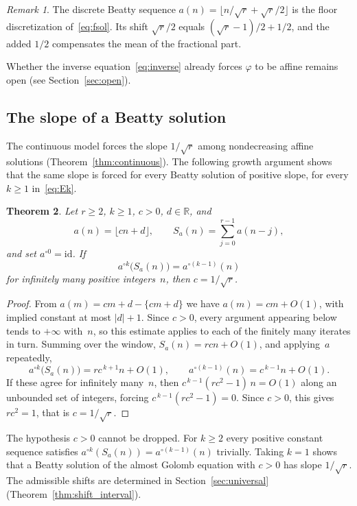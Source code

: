 \documentclass{birkjour}
\newtheorem{theorem}{Theorem}
\theoremstyle{definition}
\theoremstyle{remark}
\newtheorem{remark}[theorem]{Remark}
\newcommand{\fl}[1]{\lfloor #1 \rfloor}
\newcommand{\frc}[1]{\{ #1 \}}
\begin{document}
\begin{remark}
The discrete Beatty sequence
$a(n)=\fl{n/\!\sqrt{r}+\sqrt{r}/2}$ is the floor
discretization of~\eqref{eq:fsol}. Its shift $\sqrt{r}/2$
equals $(\sqrt{r}-1)/2+1/2$, and the added $1/2$ compensates
the mean of the fractional part.
\end{remark}

Whether the inverse equation~\eqref{eq:inverse}
already forces $\varphi$ to be affine remains open
(see Section~\ref{sec:open}).

\subsection{The slope of a Beatty solution}

The continuous model forces the slope $1/\!\sqrt{r}$ among
nondecreasing affine solutions (Theorem~\ref{thm:continuous}).
The following growth argument shows that the same slope is
forced for every Beatty solution of positive slope, for every
$k\ge 1$ in~\eqref{eq:Ek}.

\begin{theorem}\label{thm:slope}
Let $r\ge 2$, $k\ge 1$, $c>0$, $d\in\mathbb{R}$, and
\[
  a(n)=\fl{cn+d},\qquad
  S_{a}(n)=\sum_{j=0}^{r-1}a(n{-}j),
\]
and set $a^{\circ 0}=\mathrm{id}$. If
\[
  a^{\circ k}\bigl(S_{a}(n)\bigr)=a^{\circ(k-1)}(n)
\]
for infinitely many positive integers~$n$, then
$c=1/\!\sqrt{r}$.
\end{theorem}

\begin{proof}
From $a(m)=cm+d-\frc{cm+d}$ we have $a(m)=cm+O(1)$, with
implied constant at most $|d|+1$. Since $c>0$, every argument
appearing below tends to $+\infty$ with~$n$, so this estimate
applies to each of the finitely many iterates in turn. Summing
over the window, $S_{a}(n)=rcn+O(1)$, and applying~$a$
repeatedly,
\[
  a^{\circ k}\bigl(S_{a}(n)\bigr)=rc^{\,k+1}n+O(1),
  \qquad
  a^{\circ(k-1)}(n)=c^{\,k-1}n+O(1).
\]
If these agree for infinitely many~$n$, then
$c^{\,k-1}(rc^{2}-1)\,n=O(1)$ along an unbounded set of
integers, forcing $c^{\,k-1}(rc^{2}-1)=0$. Since $c>0$, this
gives $rc^{2}=1$, that is $c=1/\!\sqrt{r}$.
\end{proof}

The hypothesis $c>0$ cannot be dropped. For $k\ge 2$ every
positive constant sequence satisfies
$a^{\circ k}(S_{a}(n))=a^{\circ(k-1)}(n)$ trivially. Taking
$k=1$ shows that a Beatty solution of the almost Golomb
equation with $c>0$ has slope $1/\!\sqrt{r}$. The admissible
shifts are determined in Section~\ref{sec:universal}
(Theorem~\ref{thm:shift_interval}).
\end{document}
